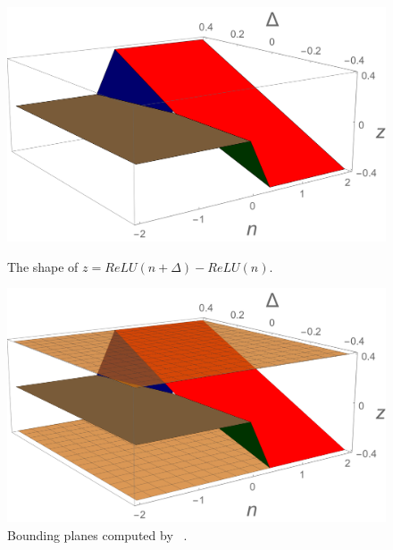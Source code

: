 \begin{figure}
\centering
%
\begin{minipage}[t]{0.45\linewidth}
\centering
\includegraphics[width=\linewidth]{neurodiff/figs/equation1.png}
\caption{The shape of $ z = ReLU(n + \Delta) - ReLU(n) $.}
\label{neurodiff:fig:equation1}
\end{minipage}%
%
\hspace{0.09\linewidth}
%
\begin{minipage}[t]{0.45\linewidth}
\centering
\includegraphics[width=\linewidth]{neurodiff/figs/naiveboundingplanes.png}
\caption{Bounding planes computed by \ReluDiff{}~\cite{paulsen2020reludiff}.}
\label{neurodiff:fig:naiveboundingplanes}
\end{minipage}


\end{figure}

